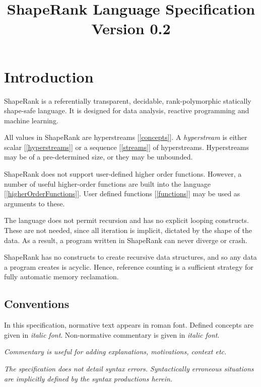 \documentclass{article}
\begin{document}
\title{ShapeRank Language Specification\\
{\large Version 0.2}
}
\maketitle

\tableofcontents

\section{Introduction}

ShapeRank is a referentially transparent, decidable, rank-polymorphic statically shape-safe language. It is designed for data analysis, reactive programming and machine learning. 

All values in ShapeRank are hyperstreams [\ref{concepts}]. A {\em hyperstream} is either scalar [\ref{hyperstreams}] or a sequence [\ref{streams}] of hyperstreams. Hyperstreams may be of a pre-determined size, or they may be unbounded. 

ShapeRank does not support user-defined higher order functions. However, a number of useful higher-order functions are built into the language [\ref{higherOrderFunctions}]. User defined functions [\ref{functions}] may be used as arguments to these.

The language does not permit recursion and has no explicit looping constructs. These are not needed, since all iteration is implicit, dictated by the shape of the data. As a result, a program written in ShapeRank can never diverge or crash. 

ShapeRank has no constructs to create recursive data structures, and so any data a program creates is acyclic. Hence, reference counting is a sufficient strategy for fully automatic memory reclamation.



\subsection{Conventions}
\label{conventions}

In this specification, normative text appears in roman font. Defined concepts are given in {\em italic font}. Non-normative commentary is given in {\em italic font}.

{\em Commentary is useful for adding explanations, motivations, context etc.}

{\em 
The specification does not detail syntax errors. Syntactically erroneous situations are implicitly defined by the syntax productions herein.
}
\end{document}
